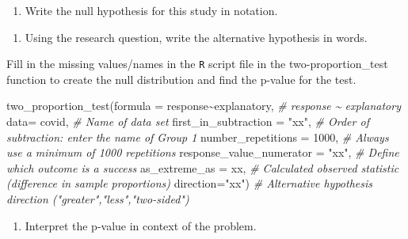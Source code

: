 \documentclass[
]{report}
\newenvironment{Shaded}{\begin{snugshade}}{\end{snugshade}}
\newcommand{\AttributeTok}[1]{\textcolor[rgb]{0.77,0.63,0.00}{#1}}
\newcommand{\CommentTok}[1]{\textcolor[rgb]{0.56,0.35,0.01}{\textit{#1}}}
\newcommand{\DecValTok}[1]{\textcolor[rgb]{0.00,0.00,0.81}{#1}}
\newcommand{\FunctionTok}[1]{\textcolor[rgb]{0.00,0.00,0.00}{#1}}
\newcommand{\NormalTok}[1]{#1}
\newcommand{\SpecialCharTok}[1]{\textcolor[rgb]{0.00,0.00,0.00}{#1}}
\newcommand{\StringTok}[1]{\textcolor[rgb]{0.31,0.60,0.02}{#1}}
\providecommand{\tightlist}{%
  \setlength{\itemsep}{0pt}\setlength{\parskip}{0pt}}
\begin{document}
\vspace{1in}

\begin{enumerate}
\def\labelenumi{\arabic{enumi}.}
\setcounter{enumi}{6}
\tightlist
\item
  Write the null hypothesis for this study in notation.
\end{enumerate}

\vspace{0.5in}

\begin{enumerate}
\def\labelenumi{\arabic{enumi}.}
\setcounter{enumi}{7}
\tightlist
\item
  Using the research question, write the alternative hypothesis in words.
\end{enumerate}

\vspace{1in}

Fill in the missing values/names in the \texttt{R} script file in the two-proportion\_test function to create the null distribution and find the p-value for the test.

\begin{Shaded}
\begin{Highlighting}[]
\FunctionTok{two\_proportion\_test}\NormalTok{(}\AttributeTok{formula =}\NormalTok{ response}\SpecialCharTok{\textasciitilde{}}\NormalTok{explanatory, }\CommentTok{\# response \textasciitilde{} explanatory}
    \AttributeTok{data=}\NormalTok{ covid, }\CommentTok{\# Name of data set}
    \AttributeTok{first\_in\_subtraction =} \StringTok{"xx"}\NormalTok{, }\CommentTok{\# Order of subtraction: enter the name of Group 1}
    \AttributeTok{number\_repetitions =} \DecValTok{1000}\NormalTok{, }\CommentTok{\# Always use a minimum of 1000 repetitions}
    \AttributeTok{response\_value\_numerator =} \StringTok{"xx"}\NormalTok{, }\CommentTok{\# Define which outcome is a success }
    \AttributeTok{as\_extreme\_as =}\NormalTok{ xx, }\CommentTok{\# Calculated observed statistic (difference in sample proportions)}
    \AttributeTok{direction=}\StringTok{"xx"}\NormalTok{) }\CommentTok{\# Alternative hypothesis direction ("greater","less","two{-}sided")}
\end{Highlighting}
\end{Shaded}

\begin{enumerate}
\def\labelenumi{\arabic{enumi}.}
\setcounter{enumi}{8}
\tightlist
\item
  Interpret the p-value in context of the problem.
\end{enumerate}
\end{document}
